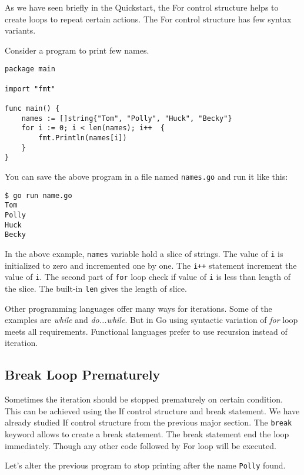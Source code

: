 As we have seen briefly in the Quickstart, the For control
structure helps to create loops to repeat certain actions.  The For
control structure has few syntax variants.

Consider a program to print few names.

\begin{lstlisting}[caption=For loop example (forbasic.go)]
package main

import "fmt"

func main() {
    names := []string{"Tom", "Polly", "Huck", "Becky"}
    for i := 0; i < len(names); i++  {
        fmt.Println(names[i])
    }
}
\end{lstlisting}

You can save the above program in a file named \texttt{names.go}
and run it like this:

\begin{lstlisting}[numbers=none]
$ go run name.go
Tom
Polly
Huck
Becky
\end{lstlisting}

In the above example, \texttt{names} variable hold a slice of strings.
The value of \texttt{i} is initialized to zero and incremented one by
one.  The \texttt{i++} statement increment the value of \texttt{i}.
The second part of \texttt{for} loop check if value of \texttt{i} is
less than length of the slice.  The built-in \texttt{len} gives the
length of slice.

Other programming languages offer many ways for iterations. Some of
the examples are \textit{while} and \textit{do...while}.  But in Go
using syntactic variation of \textit{for} loop meets all requirements.
Functional languages prefer to use recursion instead of iteration.

\subsection{Break Loop Prematurely}

Sometimes the iteration should be stopped prematurely on certain
condition.  This can be achieved using the If control structure and
break statement.  We have already studied If control structure from
the previous major section. The \texttt{break} keyword allows to
create a break statement.  The break statement end the
loop immediately.  Though any other code followed by For loop will be
executed.

Let's alter the previous program to stop printing after the
name \texttt{Polly} found.

